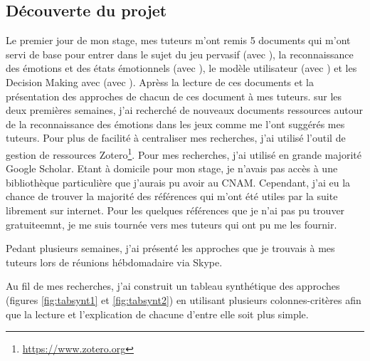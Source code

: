 \documentclass{article}
\begin{document}
	\subsection{Découverte du projet}
		Le premier jour de mon stage, mes tuteurs m'ont remis 5 documents qui m'ont servi de base pour entrer dans le sujet du jeu pervasif (avec \cite{gal_2019}), la reconnaissance des émotions et des états émotionnels (avec \cite{gal_2019,gizycka_et_al._2018,nalepa_et_al._2019}), le modèle utilisateur (avec \cite{alhudar_2019}) et les Decision Making avec (avec \cite{kornyshova_et_al._2010}).\newline
		Aprèss la lecture de ces documents et la présentation des approches de chacun de ces document à mes tuteurs. sur les deux premières semaines, j'ai recherché de nouveaux documents ressources autour de la reconnaissance des émotions dans les jeux comme me l'ont suggérés mes tuteurs. 
		Pour plus de facilité à centraliser mes recherches, j'ai utilisé l'outil de gestion de ressources Zotero\footnote{\href{https://www.zotero.org}{https://www.zotero.org}}. 
		Pour mes recherches, j'ai utilisé en grande majorité Google Scholar. 
		Etant à domicile pour mon stage, je n'avais pas accès à une bibliothèque particulière que j'aurais pu avoir au CNAM. 
		Cependant, j'ai eu la chance de trouver la majorité des références qui m'ont été utiles par la suite librement sur internet. 
		Pour les quelques références que je n'ai pas pu trouver gratuiteemnt, je me suis tournée vers mes tuteurs qui ont pu me les fournir.\par
		Pedant plusieurs semaines, j'ai présenté les approches que je trouvais à mes tuteurs lors de réunions hébdomadaire via Skype.\par
		Au fil de mes recherches, j'ai construit un tableau synthétique des approches (figures \ref{fig:tabsynt1} et \ref{fig:tabsynt2}) en utilisant plusieurs colonnes-critères afin que la lecture et l'explication de chacune d'entre elle soit plus simple.\par
\end{document}
